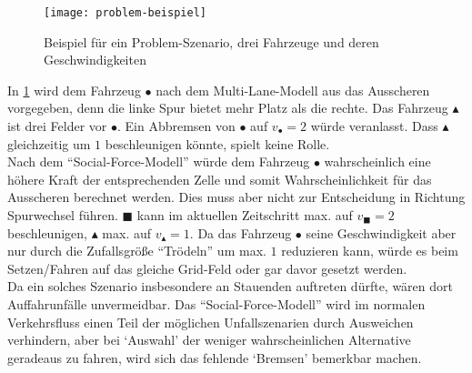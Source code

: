\begin{figure}[hptb]
 \centering
 \texttt{[image: problem-beispiel]}
 \caption[Problem-Beispiel]{Beispiel für ein Problem-Szenario, drei Fahrzeuge und deren Geschwindigkeiten}
 \label{figure:problem-beispiel}
\end{figure}

In \cref{figure:problem-beispiel} wird dem Fahrzeug $\bullet$ nach dem Multi-Lane-Modell aus \cite{multi-lane} das Ausscheren vorgegeben, denn die linke Spur bietet mehr Platz als die rechte. 
Das Fahrzeug $\blacktriangle$ ist drei Felder vor $\bullet$.
Ein Abbremsen von $\bullet$ auf $v_{\bullet}=2$ würde veranlasst.
Dass $\blacktriangle$ gleichzeitig um $1$ beschleunigen könnte, spielt keine Rolle. \\
Nach dem \enquote{Social-Force-Modell} würde dem Fahrzeug $\bullet$ wahrscheinlich eine höhere Kraft der entsprechenden Zelle und somit Wahrscheinlichkeit für das Ausscheren berechnet werden.
Dies muss aber nicht zur Entscheidung in Richtung Spurwechsel führen.
$\blacksquare$ kann im aktuellen Zeitschritt max. auf $v_{\blacksquare}=2$ beschleunigen, $\blacktriangle$ max. auf $v_{\blacktriangle}=1$.
Da das Fahrzeug $\bullet$ seine Geschwindigkeit aber nur durch die Zufallsgröße \enquote{Trödeln} um max. $1$ reduzieren kann, würde es beim Setzen/Fahren auf das gleiche Grid-Feld oder gar davor gesetzt werden. \\
Da ein solches Szenario insbesondere an Stauenden auftreten dürfte, wären dort Auffahrunfälle unvermeidbar. 
Das \enquote{Social-Force-Modell} wird im normalen Verkehrsfluss einen Teil der möglichen Unfallszenarien durch Ausweichen verhindern, aber bei \enquote*{Auswahl} der weniger wahrscheinlichen Alternative geradeaus zu fahren, wird sich das fehlende \enquote*{Bremsen} bemerkbar machen.
